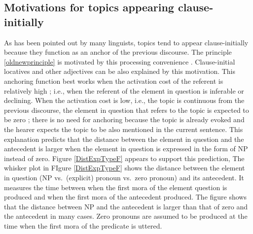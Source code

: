 \subsection{Motivations for topics appearing clause-initially}\label{TopicAppearClause-Initially}

As has been pointed out by many linguists,
topics tend to appear clause-initially
because they function as an anchor of the previous discourse.
The principle \ref{oldnewprinciple} is motivated by this processing convenience \cite[e.g.,][]{keenan77}.
Clause-initial locatives and other adjectives can be also explained by this motivation.
This anchoring function best works when the activation cost of the referent is relatively high \cite{givon83};
i.e.,
when the referent of the element in question is inferable or declining.
When the activation cost is low, i.e., the topic is continuous from the previous discourse,
the element in question that refers to the topic is expected to be zero \cite{givon83,gundeletal93,ariel90};
there is no need for anchoring because the topic is already evoked and the hearer expects the topic to be also mentioned in the current sentence.
This explanation predicts that the distance between the element in question and the antecedent is larger when the element in question is expressed in the form of NP instead of zero.
Figure \ref{DistExpTypeF} appears to support this prediction,
The whisker plot in FIgure \ref{DistExpTypeF} shows the distance between the element in question (NP vs.\ (explicit) pronoun vs.\ zero pronoun) and its antecedent.
It measures the time between when the first mora of the element question is produced and when the first mora of the antecedent produced.
The figure shows that the distance between NP and the antecedent is larger than that of zero and the antecedent in many cases.
Zero pronouns are assumed to be produced at the time
when the first mora of the predicate is uttered.

